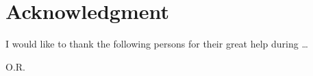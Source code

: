 \section*{Acknowledgment}
I would like to thank the following persons for their great help during \ldots


\begin{flushright}
O.R.\\[1pc]
\end{flushright}




